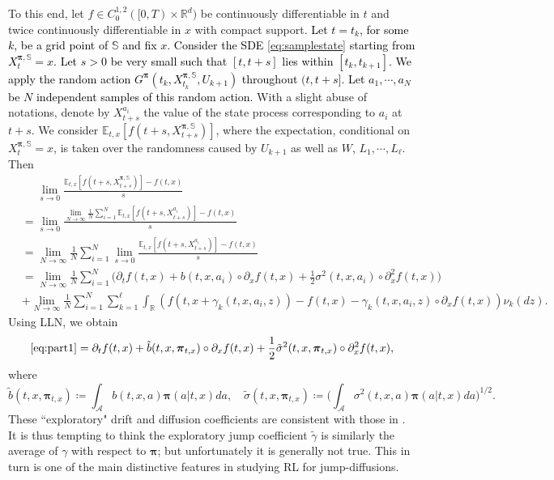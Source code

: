 \documentclass[11pt]{article}
\newcommand{\1}{\mathbbm{1}}
\newcommand{\bpi}{\boldsymbol{\pi}}
\newcommand{\rev}[1]{\textcolor{black}{{#1}}} %
\begin{document}
To this end, let $f\in C_0^{1,2}([0,T)\times\mathbb{R}^d)$ be  continuously differentiable in $t$ and twice continuously differentiable in $x$ with compact support. \rev{Let $t=t_k$, for some $k$, be a grid point of $\mathbb{S}$ and fix $x$. Consider the SDE \eqref{eq:samplestate} starting from $X^{\bpi, \mathbb{S}}_t=x$. Let $s>0$ be very small such that $[t, t +s]$ lies within $[t_k, t_{k+1}]$. We apply the random  action $G^{\bpi}(t_k, X_{t_k}^{\bpi, \mathbb{S}}, U_{k+1})$ throughout $(t,t+s]$. Let $a_1,\cdots,a_N$ be $N$ independent samples of this random action.} With a slight abuse of notations, denote by $X_{t+s}^{a_i}$ the value of the state process corresponding to ${a}_i$ at $t+s$.  We consider  $\mathbb{E}_{t,x}[f(t+s, X_{t+s}^{\bpi, \mathbb{S}})]$, where the expectation, conditional on  $X^{\bpi, \mathbb{S}}_t=x$, is taken over the randomness caused by $U_{k+1}$ as well as $W$, $L_1,\cdots,L_\ell$.  Then
\begin{align}
	&\phantom{=}\lim_{s\to 0}\frac{\mathbb{E}_{t,x}[f(t+s, X_{t+s}^{\bpi, \mathbb{S}})]-f(t,x)}{s}\\
	&=\lim_{s\to 0}\frac{\lim_{N\to\infty}\frac{1}{N}\sum_{i=1}^N \mathbb{E}_{t,x}[f(t+s,X_{t+s}^{a_i})]-f(t,x)}{s}\\
	&=\lim_{N\to\infty}\frac{1}{N}\sum_{i=1}^N\lim_{s\to 0}\frac{ \mathbb{E}_{t,x}[f(t+s,X_{t+s}^{a_i})]-f(t,x)}{s}\\
	&=\lim_{N\to\infty}\frac{1}{N}\sum_{i=1}^N \big( \partial_t f(t,x) + b(t,x,a_i)\circ\partial_x f(t,x) + \frac{1}{2}\sigma^2(t,x,a_i)\circ\partial_x^2 f(t,x)\big)\label{eq:part1}\\
	&+\lim_{N\to\infty}\frac{1}{N} \sum_{i=1}^N\sum_{k=1}^\ell \int_{\mathbb{R}} \left( f(t, x+ \gamma_k(t, x ,a_i, z)) - f(t,x) - \gamma_k(t,x,a_i,z) \circ  \partial_xf(t,x) \right) \nu_k (dz)\label{eq:part2}.
\end{align}
Using LLN, we obtain
\begin{equation}
\eqref{eq:part1}=\partial_tf(t,x) + \tilde{b}(t, x, \bpi_{t,x})\circ\partial_x f(t,x) + \frac{1}{2}\tilde{\sigma}^2(t, x, \bpi_{t,x})\circ\partial^2_x f(t,x),\label{eq:expl-gen-diff}
\end{equation}
where
\begin{equation}
	\tilde{b}(t, x, \bpi_{t,x})\coloneqq\int_{\mathcal{A}} b(t, x, a) \bpi(a|t,x)da,\quad \tilde{\sigma}(t, x, \bpi_{t,x})\coloneqq\Big(\int_{\mathcal{A}} \sigma^2(t, x, a) \bpi(a|t,x)da\Big)^{1/2}.\label{eq:diff-expl-coeff}
\end{equation}
These ``exploratory" drift and diffusion coefficients are %
consistent with those in \cite{wang2020reinforcement}. It is thus tempting to think the exploratory jump coefficient $\tilde \gamma$ is similarly the average of $\gamma$ with respect to $\bpi$; but unfortunately it is generally not true. This in turn is one of the main distinctive features in studying RL for jump-diffusions.
\end{document}
